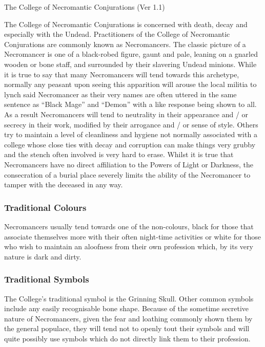 \begin{Chapter}{The College of Necromantic Conjurations (Ver 1.1)}

The College of Necromantic Conjurations is concerned with death, decay
and especially with the Undead. Practitioners of the College of
Necromantic Conjurations are commonly known as Necromancers.  The
classic picture of a Necromancer is one of a black-robed figure, gaunt
and pale, leaning on a gnarled wooden or bone staff, and surrounded by
their slavering Undead minions. While it is true to say that many
Necromancers will tend towards this archetype, normally any peasant
upon seeing this apparition will arouse the local militia to lynch
said Necromancer as their very names are often uttered in the same
sentence as “Black Mage” and “Demon” with a like response being shown
to all.  As a result Necromancers will tend to neutrality in their
appearance and / or secrecy in their work, modified by their arrogance
and / or sense of style.  Others try to maintain a level of
cleanliness and hygiene not normally associated with a college whose
close ties with decay and corruption can make things very grubby and
the stench often involved is very hard to erase. Whilst it is true
that Necromancers have no direct affiliation to the Powers of Light or
Darkness, the consecration of a burial place severely limits the
ability of the Necromancer to tamper with the deceased in any way.

\subsubsection{Traditional Colours}

Necromancers usually tend towards one of the non-colours, black for
those that associate themselves more with their often night-time
activities or white for those who wish to maintain an aloofness from
their own profession which, by its very nature is dark and dirty.

\subsubsection{Traditional Symbols}

The College’s traditional symbol is the Grinning Skull.  Other common
symbols include any easily recognisable bone shape. Because of the
sometime secretive nature of Necromancers, given the fear and loathing
commonly shown them by the general populace, they will tend not to
openly tout their symbols and will quite possibly use symbols which do
not directly link them to their profession.


\end{Chapter}

